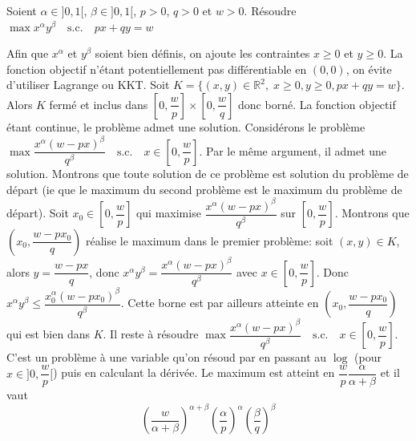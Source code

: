 \documentclass{fancybook}
\begin{document}
\begin{exercice}
Soient $\alpha\in ]0,1[$, $\beta\in ]0,1[$, $p>0$, $q>0$ et $w>0$.\newline
Résoudre $\max x^\alpha y^\beta \quad \text{s.c.} \quad px+qy=w$
\end{exercice}
Afin que $x^\alpha$ et $y^\beta$ soient bien définis, on ajoute les contraintes $x\geq 0$ et $y\geq 0$. La fonction objectif n'étant potentiellement pas différentiable en $(0,0)$, on évite d'utiliser Lagrange ou KKT.\newline
\newline
Soit $K=\{(x,y)\in \mathbb R^2,\; x\geq 0, y\geq 0, px+qy=w\}$. Alors $K$ fermé et inclus dans $[0,\dfrac wp]\times [0,\dfrac wq]$ donc borné. La fonction objectif étant continue, le problème admet une solution.\newline
\newline
Considérons le problème $\max \dfrac{x^\alpha (w-px)^\beta}{q^\beta}\quad \text{s.c.} \quad x\in [0,\dfrac wp]$. Par le même argument, il admet une solution. Montrons que toute solution de ce problème est solution du problème de départ (ie que le maximum du second problème est le maximum du problème de départ). \newline
Soit $x_0\in [0,\dfrac wp]$ qui maximise $\dfrac{x^\alpha (w-px)^\beta}{q^\beta}$ sur $[0,\dfrac wp]$. Montrons que $(x_0,\dfrac{w-px_0}{q})$ réalise le maximum dans le premier problème: soit $(x,y)\in K$, alors $y=\dfrac{w-px}{q}$, donc $x^\alpha y^\beta=\dfrac{x^\alpha (w-px)^\beta}{q^\beta}$ avec $x\in [0,\dfrac wp]$. Donc $x^\alpha y^\beta\leq \dfrac{x_0^\alpha (w-px_0)^\beta}{q^\beta}$. Cette borne est par ailleurs atteinte en $(x_0,\dfrac{w-px_0}{q})$ qui est bien dans $K$.\newline
\newline
Il reste à résoudre $\max \dfrac{x^\alpha (w-px)^\beta}{q^\beta}\quad \text{s.c.} \quad x\in [0,\dfrac wp]$. C'est un problème à une variable qu'on résoud par en passant au $\log$ (pour $x\in ]0,\dfrac wp[$) puis en calculant la dérivée.\newline
Le maximum est atteint en $\dfrac{w}{p} \dfrac{\alpha}{\alpha+\beta}$ et il vaut $$\left(\dfrac{w}{\alpha + \beta} \right)^{\alpha + \beta} \left(\dfrac{\alpha}{p} \right)^{\alpha} \left(\dfrac{\beta}{q} \right)^{\beta}$$
\end{document}
